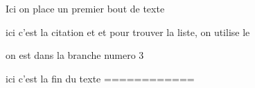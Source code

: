 \documentclass{sn-jnl}%
\begin{document}
Ici on place un premier bout de texte

	ici c'est la citation  
			\cite{declerck_vitro_2005}et  \cite{fortin_arbuscular_2002}et pour trouver la liste, \cite{silvani_novel_2019}on utilise le 

on est dans la branche numero 3

ici c'est la fin du texte
============%

\end{document}
